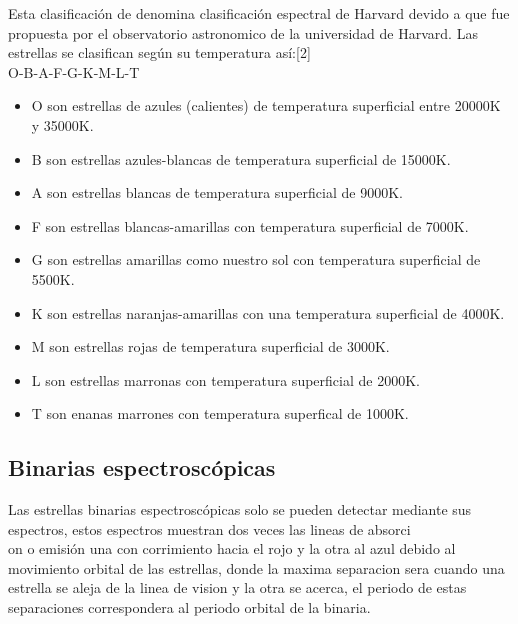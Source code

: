 \documentclass[Proceedings]{ascelike}
\begin{document}
Esta clasificaci\'on de denomina clasificaci\'on espectral de Harvard devido a que fue propuesta por el observatorio astronomico de la universidad de Harvard. Las estrellas se clasifican seg\'un su temperatura as\'i:[2]\\

O-B-A-F-G-K-M-L-T\\

\begin{itemize}

\item O son estrellas de azules (calientes) de temperatura superficial entre 20000K y 35000K.\\
\item B son estrellas azules-blancas de temperatura superficial de 15000K.\\
\item A son estrellas blancas de temperatura superficial de 9000K.\\
\item F son estrellas blancas-amarillas con temperatura superficial de 7000K.\\
\item G son estrellas amarillas como nuestro sol con temperatura superficial de 5500K.\\
\item K son estrellas naranjas-amarillas con una temperatura superficial de 4000K.\\
\item M son estrellas rojas de temperatura superficial de 3000K.\\
\item L son estrellas marronas con temperatura superficial de 2000K.\\
\item T son enanas marrones con temperatura superfical de 1000K.\\
\end{itemize}


\subsection{Binarias espectrosc\'opicas}

Las estrellas binarias espectrosc\'opicas solo se pueden detectar mediante sus espectros,  
estos espectros muestran dos veces las lineas de absorci\\on o emisi\'on una con corrimiento hacia 
el rojo y la otra al azul debido al movimiento
orbital de las estrellas, donde la maxima separacion sera cuando una estrella se aleja de la
linea de vision y la otra se acerca, el periodo de estas separaciones correspondera al periodo
orbital de la binaria.
\end{document}
